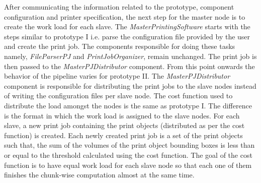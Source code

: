 After communicating the information related to the prototype, component configuration and printer specification, the next step for the master node is to create the work load for each slave. The \textit{MasterPrintingSoftware} starts with the steps similar to prototype I i.e. parse the configuration file provided by the user and create the print job. The components responsible for doing these tasks namely, \textit{FileParserPJ} and \textit{PrintJobOrganizer}, remain unchanged. The print job is then passed to the \textit{MasterPJDistributor} component. From this point onwards the behavior of the pipeline varies for prototype II. The \textit{MasterPJDistributor} component is responsible for distributing the print jobs to the slave nodes instead of writing the configuration files per slave node. The cost function used to distribute the load amongst the nodes is the same as prototype I. The difference is the format in which the work load is assigned to the slave nodes. For each slave, a new print job containing the print objects (distributed as per the cost function) is created. Each newly created print job is a set of the print objects such that, the sum of the volumes of the print object bounding boxes is less than or equal to the threshold calculated using the cost function. The goal of the cost function is to have equal work load for each slave node so that each one of them finishes the chunk-wise computation almost at the same time.\newline

